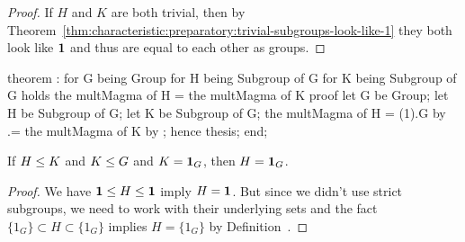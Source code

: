 \begin{proof}
If $H$ and $K$ are both trivial, then by Theorem~\ref{thm:characteristic:preparatory:trivial-subgroups-look-like-1} they both look like $\mathbf{1}$
and thus are equal to each other as groups.
\end{proof}

\nwenddocs{}\endmoddef\nwstartdeflinemarkup{}\nwenddeflinemarkup
theorem :
  for G being Group
  for H being  Subgroup of G
  for K being  Subgroup of G
  holds the multMagma of H = the multMagma of K
proof
  let G be Group;
  let H be  Subgroup of G;
  let K be  Subgroup of G;
  the multMagma of H = (1).G by 
                    .= the multMagma of K by ;
  hence thesis;
end;
\eatline
{}\nwendcode{}\nwdocspar
\begin{theorem}
If $H\leq K$ and $K\leq G$ and $K=\mathbf{1}_{G}$, then $H=\mathbf{1}_{G}$.
\end{theorem}

\begin{proof}
We have $\mathbf{1}\leq H\leq\mathbf{1}$ imply
$H=\mathbf{1}$. But since we didn't use strict subgroups, we need
to work with their underlying sets and the fact $\{1_{G}\}\subset
H\subset\{1_{G}\}$ implies $H=\{1_{G}\}$ by Definition~.
\end{proof}

